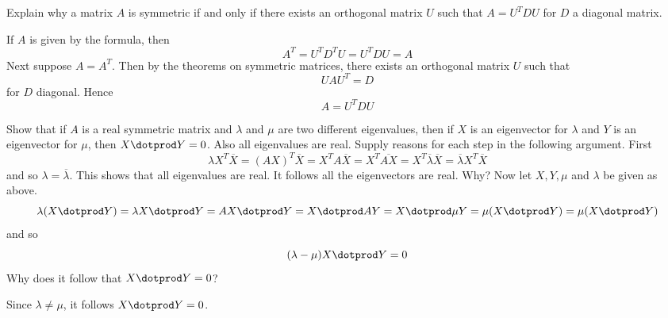 \begin{ex} Explain why a matrix $A$ is symmetric if and only if there exists an
orthogonal matrix $U$ such that $A=U^{T}DU$ for $D$ a diagonal matrix.
\begin{sol}
If $A$ is given by the formula, then
\[
A^{T}=U^{T}D^{T}U=U^{T}DU=A
\]
Next suppose $A=A^{T}$. Then by the theorems on symmetric matrices, there
exists an orthogonal matrix $U$ such that
\[
UAU^{T}=D
\]
for $D$ diagonal. Hence
\[
A=U^{T}DU
\]
\end{sol}
\end{ex}

\begin{ex} Show that if $A$ is a real symmetric matrix and 
$\lambda $ and $\mu $ are two different eigenvalues, then if $X$ is
an eigenvector for $\lambda $ and $Y$ is an eigenvector for $\mu$,
then $X\dotprod Y=0$. Also all eigenvalues are real. Supply reasons
for each step in the following argument. First 
\begin{equation*}
\lambda X^{T}\overline{X}=(AX) ^{T}
\overline{X}=X^{T}A\overline{X}=X^{T}
\overline{AX}=X^{T}\overline{\lambda }\overline{X}
=\overline{\lambda }X^{T}\overline{X}
\end{equation*}
and so $\lambda =\overline{\lambda }$. This shows that all eigenvalues are
real. It follows all the eigenvectors are real. Why? Now let $X,Y
,\mu $ and $\lambda $ be given as above. \ 
\begin{equation*}
\lambda (X\dotprod Y) =\lambda X\dotprod Y=AX\dotprod Y=X\dotprod AY=X\dotprod \mu Y=\mu (
X\dotprod Y) =\mu (X\dotprod Y)
\end{equation*}
and so 
\begin{equation*}
(\lambda -\mu) X\dotprod Y=0
\end{equation*}
Why does it follow that $X\dotprod Y=0$?
\begin{sol}
Since $\lambda \neq \mu$, it follows $X \dotprod Y =0$.
\end{sol}
\end{ex}

